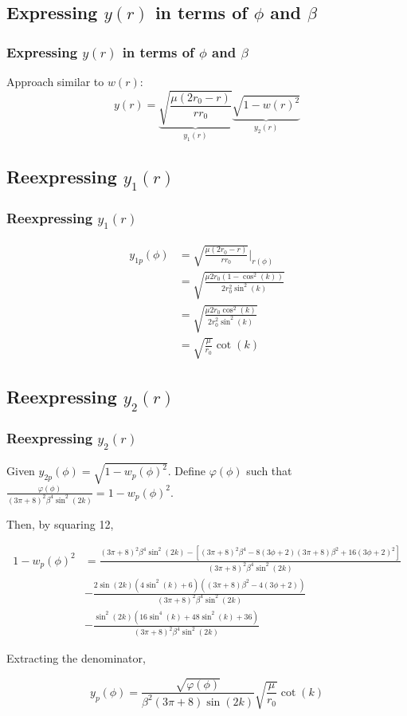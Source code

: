 \documentclass{beamer}
\newcommand{\sectit}[1]{
    \section{\texorpdfstring{#1}{}}
    \frametitle{\texorpdfstring{#1}{}}
}
\begin{document}
\begin{frame}
    \sectit{Expressing $y(r)$ in terms of $\phi$ and $\beta$}

    Approach similar to $w(r)$:
    $$
    y(r)=\underbrace{\sqrt{\frac{\mu(2r_0-r)}{rr_0}}}_{y_1(r)}\underbrace{\sqrt{1-w(r)^2}}_{y_2(r)}
    $$
\end{frame}

\begin{frame}
    \sectit{Reexpressing $y_1(r)$}

    \begin{align}
        y_{1p}(\phi)&=\sqrt{\frac{\mu(2r_0-r)}{rr_0}}\bigg\rvert_{r(\phi)}\\
        &=\sqrt{\frac{\mu 2r_0(1-\cos^2(k))}{2r_0^2\sin^2(k)}}\\
        &=\sqrt{\frac{\mu 2r_0 \cos^2(k)}{2r_0^2 \sin^2(k)}}\\
        &=\sqrt{\frac{\mu}{r_0}}\cot(k)
    \end{align}
\end{frame}

\begin{frame}
    \sectit{Reexpressing $y_2(r)$}

    Given $y_{2p}(\phi)=\sqrt{1-w_p(\phi)^2}$.\newline
    Define $\varphi(\phi)$ such that $\frac{\varphi(\phi)}{(3\pi+8)^2\beta^4\sin^2(2k)}=1-w_p(\phi)^2$.

    Then, by squaring 12,

    {\tiny
        \begin{align}
            1-w_p(\phi)^2&=\frac{(3\pi+8)^2\beta^4\sin^2(2k)-\left[(3\pi+8)^2\beta^4-8(3\phi+2)(3\pi+8)\beta^2+16(3\phi+2)^2\right]}{(3\pi+8)^2\beta^4\sin^2(2k)}\\
            &-\frac{2\sin(2k)(4\sin^2(k)+6)((3\pi+8)\beta^2-4(3\phi+2))}{(3\pi+8)^2\beta^4\sin^2(2k)}\\
            &-\frac{\sin^2(2k)(16\sin^4(k)+48\sin^2(k)+36)}{(3\pi+8)^2\beta^4\sin^2(2k)}
        \end{align}
    }

    Extracting the denominator,

    \begin{equation}
    y_p(\phi)=\frac{\sqrt{\varphi(\phi)}}{\beta^2(3\pi+8)\sin(2k)}\sqrt{\frac{\mu}{r_0}}\cot(k)
    \end{equation}

\end{frame}
\end{document}

